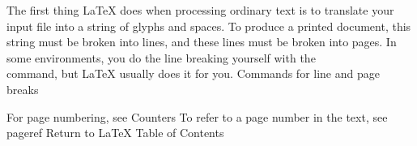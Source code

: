 \documentclass[a4paper,11pt]{book} %
\begin{document}
The first thing LaTeX does when processing ordinary text is to translate your input file into a string of glyphs and spaces. To produce a printed document, this string must be broken into lines, and these lines must be broken into pages. In some environments, you do the line breaking yourself with the \\ command, but LaTeX usually does it for you.
Commands for line and page breaks

%
%

For page numbering, see Counters
To refer to a page number in the text, see \\pageref
Return to LaTeX Table of Contents 
\end{document}

